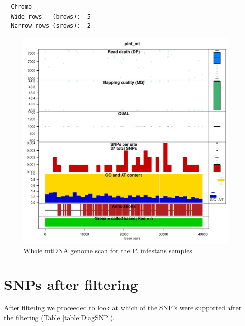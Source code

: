 \documentclass{article}\usepackage[]{graphicx}\usepackage[]{color}
\makeatletter
\def\maxwidth{ %
  \ifdim\Gin@nat@width>\linewidth
    \linewidth
  \else
    \Gin@nat@width
  \fi
}
\newenvironment{kframe}{%
 \def\at@end@of@kframe{}%
 \ifinner\ifhmode%
  \def\at@end@of@kframe{\end{minipage}}%
  \begin{minipage}{\columnwidth}%
 \fi\fi%
 \def\FrameCommand##1{\hskip\@totalleftmargin \hskip-\fboxsep
 \colorbox{shadecolor}{##1}\hskip-\fboxsep
     \hskip-\linewidth \hskip-\@totalleftmargin \hskip\columnwidth}%
 \MakeFramed {\advance\hsize-\width
   \@totalleftmargin\z@ \linewidth\hsize
   \@setminipage}}%
 {\par\unskip\endMakeFramed%
 \at@end@of@kframe}
\newenvironment{knitrout}{}{} %
\makeatother
\begin{document}
\begin{knitrout}
\color{fgcolor}\begin{kframe}
\begin{verbatim}
  Chromo
  Wide rows   (brows):  5 
  Narrow rows (srows):  2 
\end{verbatim}
\end{kframe}\begin{figure}[h!]

\includegraphics[width=\maxwidth]{figure/chromogc} \caption[Whole mtDNA genome scan for the P]{Whole mtDNA genome scan for the P. infestans samples.\label{fig:chromogc}}
\end{figure}


\end{knitrout}



\section{SNPs after filtering}

After filtering we proceeded to look at which of the SNP's were supported after the filtering (Table \ref{table:DiagSNP}).
\end{document}
